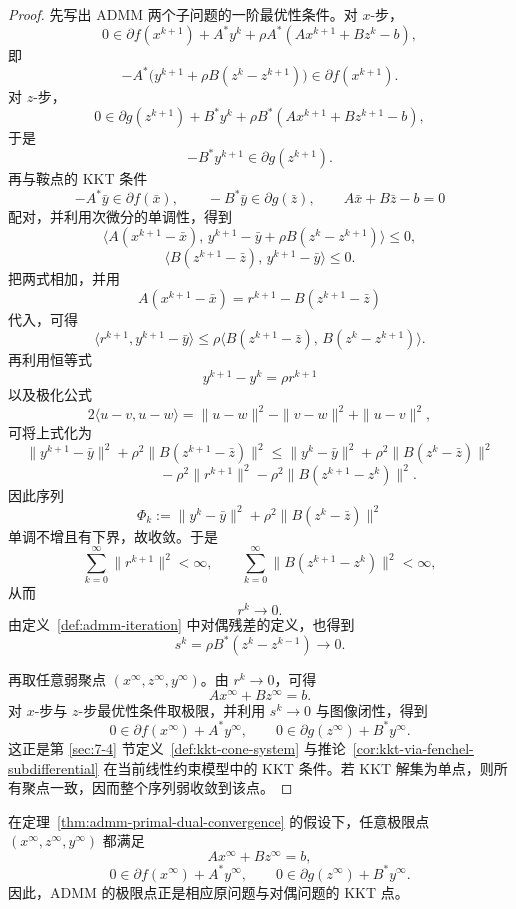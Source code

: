 \begin{proof}
先写出 ADMM 两个子问题的一阶最优性条件。对 $x$-步，
\[
0\in \partial f(x^{k+1})+A^\ast y^k+\rho A^\ast(Ax^{k+1}+Bz^k-b),
\]
即
\[
-A^\ast\bigl(y^{k+1}+\rho B(z^k-z^{k+1})\bigr)\in \partial f(x^{k+1}).
\]
对 $z$-步，
\[
0\in \partial g(z^{k+1})+B^\ast y^k+\rho B^\ast(Ax^{k+1}+Bz^{k+1}-b),
\]
于是
\[
-B^\ast y^{k+1}\in \partial g(z^{k+1}).
\]
再与鞍点的 KKT 条件
\[
-A^\ast\bar y\in \partial f(\bar x),
\qquad
-B^\ast\bar y\in \partial g(\bar z),
\qquad
A\bar x+B\bar z-b=0
\]
配对，并利用次微分的单调性，得到
\[
\bigl\langle A(x^{k+1}-\bar x),\, y^{k+1}-\bar y+\rho B(z^k-z^{k+1}) \bigr\rangle \le 0,
\]
\[
\bigl\langle B(z^{k+1}-\bar z),\, y^{k+1}-\bar y \bigr\rangle \le 0.
\]
把两式相加，并用
\[
A(x^{k+1}-\bar x)=r^{k+1}-B(z^{k+1}-\bar z)
\]
代入，可得
\[
\langle r^{k+1},y^{k+1}-\bar y\rangle
\le
\rho \langle B(z^{k+1}-\bar z),\,B(z^k-z^{k+1})\rangle.
\]
再利用恒等式
\[
y^{k+1}-y^k=\rho r^{k+1}
\]
以及极化公式
\[
2\langle u-v,u-w\rangle
=
\|u-w\|^2-\|v-w\|^2+\|u-v\|^2,
\]
可将上式化为
\[
\|y^{k+1}-\bar y\|^2+\rho^2\|B(z^{k+1}-\bar z)\|^2
\le
\|y^k-\bar y\|^2+\rho^2\|B(z^k-\bar z)\|^2
\]
\[
\qquad\qquad
-\rho^2\|r^{k+1}\|^2-\rho^2\|B(z^{k+1}-z^k)\|^2.
\]
因此序列
\[
\Phi_k:=\|y^k-\bar y\|^2+\rho^2\|B(z^k-\bar z)\|^2
\]
单调不增且有下界，故收敛。于是
\[
\sum_{k=0}^\infty \|r^{k+1}\|^2<\infty,
\qquad
\sum_{k=0}^\infty \|B(z^{k+1}-z^k)\|^2<\infty,
\]
从而
\[
r^k\to 0.
\]
由定义~\ref{def:admm-iteration} 中对偶残差的定义，也得到
\[
s^k=\rho B^\ast(z^k-z^{k-1})\to 0.
\]

再取任意弱聚点 $(x^\infty,z^\infty,y^\infty)$。由 $r^k\to 0$，可得
\[
Ax^\infty+Bz^\infty=b.
\]
对 $x$-步与 $z$-步最优性条件取极限，并利用 $s^k\to 0$ 与图像闭性，得到
\[
0\in \partial f(x^\infty)+A^\ast y^\infty,
\qquad
0\in \partial g(z^\infty)+B^\ast y^\infty.
\]
这正是第 \ref{sec:7-4} 节定义~\ref{def:kkt-cone-system} 与推论~\ref{cor:kkt-via-fenchel-subdifferential} 在当前线性约束模型中的 KKT 条件。若 KKT 解集为单点，则所有聚点一致，因而整个序列弱收敛到该点。
\end{proof}

\begin{corollary}\label{cor:admm-kkt-limit}
在定理~\ref{thm:admm-primal-dual-convergence} 的假设下，任意极限点 $(x^\infty,z^\infty,y^\infty)$ 都满足
\[
Ax^\infty+Bz^\infty=b,
\]
\[
0\in \partial f(x^\infty)+A^\ast y^\infty,
\qquad
0\in \partial g(z^\infty)+B^\ast y^\infty.
\]
因此，ADMM 的极限点正是相应原问题与对偶问题的 KKT 点。
\end{corollary}

